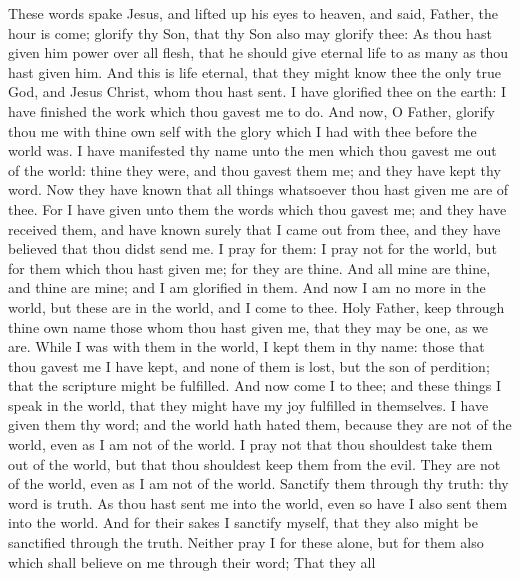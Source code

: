  These words spake Jesus, and lifted up his eyes to
heaven, and said, Father, the hour is come; glorify thy Son, that thy
Son also may glorify thee:  As thou hast given him power
over all flesh, that he should give eternal life to as many as thou hast
given him.  And this is life eternal, that they might know
thee the only true God, and Jesus Christ, whom thou hast sent.
 I have glorified thee on the earth: I have finished the
work which thou gavest me to do.  And now, O Father,
glorify thou me with thine own self with the glory which I had with thee
before the world was.  I have manifested thy name unto the
men which thou gavest me out of the world: thine they were, and thou
gavest them me; and they have kept thy word.  Now they
have known that all things whatsoever thou hast given me are of thee.
 For I have given unto them the words which thou gavest
me; and they have received them, and have known surely that I came out
from thee, and they have believed that thou didst send me.
 I pray for them: I pray not for the world, but for them
which thou hast given me; for they are thine.  And all
mine are thine, and thine are mine; and I am glorified in them.
 And now I am no more in the world, but these are in the
world, and I come to thee. Holy Father, keep through thine own name
those whom thou hast given me, that they may be one, as we are.
 While I was with them in the world, I kept them in thy
name: those that thou gavest me I have kept, and none of them is lost,
but the son of perdition; that the scripture might be fulfilled.
 And now come I to thee; and these things I speak in the
world, that they might have my joy fulfilled in themselves.
 I have given them thy word; and the world hath hated
them, because they are not of the world, even as I am not of the world.
 I pray not that thou shouldest take them out of the
world, but that thou shouldest keep them from the evil. 
They are not of the world, even as I am not of the world.
 Sanctify them through thy truth: thy word is truth.
 As thou hast sent me into the world, even so have I also
sent them into the world.  And for their sakes I sanctify
myself, that they also might be sanctified through the truth.
 Neither pray I for these alone, but for them also which
shall believe on me through their word;  That they all
